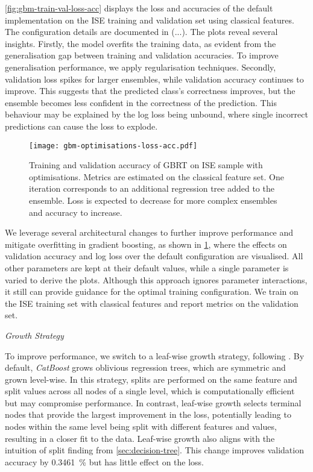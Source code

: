 \cref{fig:gbm-train-val-loss-acc} displays the loss and accuracies of the default implementation on the \gls{ISE} training and validation set using classical features. The configuration details are documented in (...). The plots reveal several insights. Firstly, the model overfits the training data, as evident from the generalisation gap between training and validation accuracies. To improve generalisation performance, we apply regularisation techniques. Secondly, validation loss spikes for larger ensembles, while validation accuracy continues to improve. This suggests that the predicted class's correctness improves, but the ensemble becomes less confident in the correctness of the prediction. This behaviour may be explained by the log loss being unbound, where single incorrect predictions can cause the loss to explode.

\begin{figure}[ht]
    \centering
    \texttt{[image: gbm-optimisations-loss-acc.pdf]}
    \caption[Training and Validation Accuracy of  on  with Optimisations]{Training and validation accuracy of \gls{GBRT} on \gls{ISE} sample with optimisations. Metrics are estimated on the classical feature set. One iteration corresponds to an additional regression tree added to the ensemble. Loss is expected to decrease for more complex ensembles and accuracy to increase.}
    \label{fig:gbm-optimisations-loss-acc}
\end{figure}

We leverage several architectural changes to further improve performance and mitigate overfitting in gradient boosting, as shown in \cref{fig:gbm-optimisations-loss-acc}, where the effects on validation accuracy and log loss over the default configuration are visualised. All other parameters are kept at their default values, while a single parameter is varied to derive the plots. Although this approach ignores parameter interactions, it still can provide guidance for the optimal training configuration. We train on the ISE training set with classical features and report metrics on the validation set.

\emph{Growth Strategy}

To improve performance, we switch to a leaf-wise growth strategy, following \textcite[][4]{chenXGBoostScalableTree2016}. By default, \emph{CatBoost} grows oblivious regression trees, which are symmetric and grown level-wise. In this strategy, splits are performed on the same feature and split values across all nodes of a single level, which is computationally efficient but may compromise performance. In contrast, leaf-wise growth selects terminal nodes that provide the largest improvement in the loss, potentially leading to nodes within the same level being split with different features and values, resulting in a closer fit to the data. Leaf-wise growth also aligns with the intuition of split finding from \cref{sec:decision-tree}. This change improves validation accuracy by \SI{0.3461}{\percent} but has little effect on the loss.


